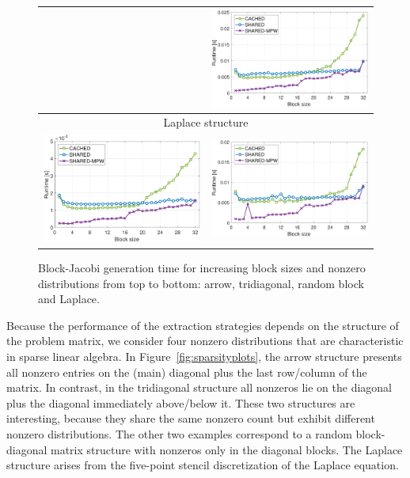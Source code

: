 \begin{figure}
\begin{center}
{\begin{tabular}{cc}
&
\includegraphics[width=.46\columnwidth]{plots/RND_bjp_setup_bs_d_P100.pdf}\\
\hline
\multicolumn{2}{c}{Laplace structure}\\
\includegraphics[width=.46\columnwidth]{plots/LAP_bjp_setup_bs_d_K40.pdf}
&
\includegraphics[width=.46\columnwidth]{plots/LAP_bjp_setup_bs_d_P100.pdf}\\
\end{tabular}
}
\end{center}
\caption{
Block-Jacobi generation time for increasing block sizes and nonzero distributions
from top to bottom: arrow, tridiagonal, random block and Laplace.
}
\label{fig:block-jacobi-runtime}
\end{figure}

Because the performance of the extraction strategies depends on the structure of the
problem matrix, we consider four nonzero distributions that are characteristic
in sparse linear algebra. In Figure~\ref{fig:sparsityplots}, the arrow
	structure presents all nonzero entries on the (main) diagonal plus the last
row/column of the matrix. In contrast, in the tridiagonal structure all
nonzeros lie on the diagonal plus the diagonal immediately above/below it. These
two structures are interesting, because they share the same nonzero count but exhibit
different nonzero distributions. The other two examples correspond to a 
random block-diagonal matrix structure with nonzeros only in the
diagonal blocks. The Laplace structure arises from the five-point
stencil discretization of the Laplace equation.

